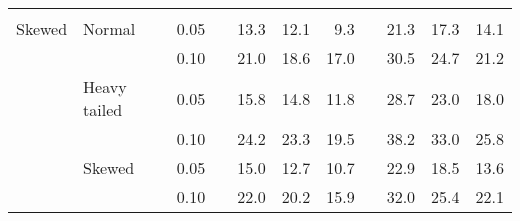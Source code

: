 \begin{table}[ht]
\begin{scriptsize}
\begin{center}
\begin{tabular}{ll p{.1cm} c p{.1cm} rrr p{.1cm} rrr}
&&&&&&&&&&&\\
Skewed       & Normal       && 0.05 &&   13.3 & 12.1 & 9.3 &   & 21.3 & 17.3 & 14.1 \\ 
             &              && 0.10 &&   21.0 & 18.6 & 17.0 &   & 30.5 & 24.7 & 21.2 \\ 
             & Heavy tailed && 0.05 &&   15.8 & 14.8 & 11.8 &   & 28.7 & 23.0 & 18.0 \\ 
             &              && 0.10 &&   24.2 & 23.3 & 19.5 &   & 38.2 & 33.0 & 25.8 \\ 
             & Skewed       && 0.05 &&   15.0 & 12.7 & 10.7 &   & 22.9 & 18.5 & 13.6 \\ 
             &              && 0.10 &&   22.0 & 20.2 & 15.9 &   & 32.0 & 25.4 & 22.1 \\ 


\end{tabular}
\end{center}
\end{scriptsize}
\end{table}
